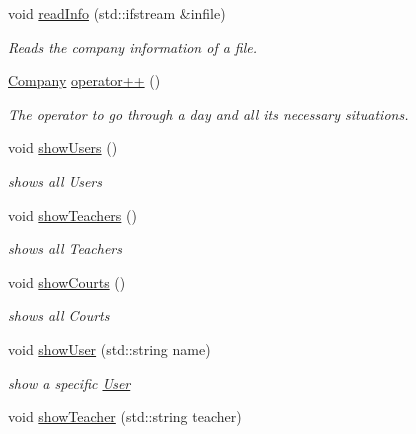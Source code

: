 \begin{DoxyCompactItemize}
void \mbox{\hyperlink{class_company_a2b97cd4ed80ecab0aa92d0f9c1f81071}{read\+Info}} (std\+::ifstream \&infile)
\begin{DoxyCompactList}\small\item\em Reads the company information of a file. \end{DoxyCompactList}\item 
\mbox{\hyperlink{class_company}{Company}} \mbox{\hyperlink{class_company_a80d971b44bc73adbb2bf3317f7747414}{operator++}} ()
\begin{DoxyCompactList}\small\item\em The operator to go through a day and all its necessary situations. \end{DoxyCompactList}\item 
\mbox{\label{class_company_a9446ed52b7e2831b24488072d1e54cde}} 
void \mbox{\hyperlink{class_company_a9446ed52b7e2831b24488072d1e54cde}{show\+Users}} ()
\begin{DoxyCompactList}\small\item\em shows all Users \end{DoxyCompactList}\item 
\mbox{\label{class_company_a81e7a22e6ea3e09b3865d44f3d9354f3}} 
void \mbox{\hyperlink{class_company_a81e7a22e6ea3e09b3865d44f3d9354f3}{show\+Teachers}} ()
\begin{DoxyCompactList}\small\item\em shows all Teachers \end{DoxyCompactList}\item 
\mbox{\label{class_company_a1779c78bdc9a4416a482be25b71efcd0}} 
void \mbox{\hyperlink{class_company_a1779c78bdc9a4416a482be25b71efcd0}{show\+Courts}} ()
\begin{DoxyCompactList}\small\item\em shows all Courts \end{DoxyCompactList}\item 
void \mbox{\hyperlink{class_company_a664aa9b9bde35eae3a564edec73cf5b3}{show\+User}} (std\+::string name)
\begin{DoxyCompactList}\small\item\em show a specific \mbox{\hyperlink{class_user}{User}} \end{DoxyCompactList}\item 
void \mbox{\hyperlink{class_company_aa64ff74648761cfe39d4a9fb0c72031f}{show\+Teacher}} (std\+::string teacher)

\end{DoxyCompactItemize}
